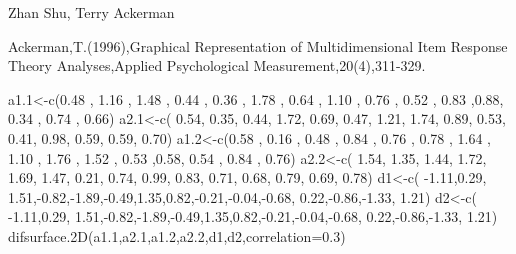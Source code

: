 \begin{Author}\relax
Zhan Shu, Terry Ackerman
\end{Author}
\begin{References}\relax
Ackerman,T.(1996),Graphical Representation of Multidimensional Item Response Theory Analyses,Applied Psychological Measurement,20(4),311-329.
\end{References}
\begin{Examples}
\begin{ExampleCode}
a1.1<-c(0.48 , 1.16 , 1.48 , 0.44 , 0.36 , 1.78 , 0.64 , 1.10 , 0.76 , 0.52 , 0.83 ,0.88, 0.34 , 0.74 , 0.66)
a2.1<-c( 0.54, 0.35, 0.44, 1.72, 0.69, 0.47, 1.21, 1.74, 0.89, 0.53, 0.41, 0.98, 0.59, 0.59, 0.70)
a1.2<-c(0.58 , 0.16 , 0.48 , 0.84 , 0.76 , 0.78 , 1.64 , 1.10 , 1.76 , 1.52 , 0.53 ,0.58, 0.54 , 0.84 , 0.76)
a2.2<-c( 1.54, 1.35, 1.44, 1.72, 1.69, 1.47, 0.21, 0.74, 0.99, 0.83, 0.71, 0.68, 0.79, 0.69, 0.78)
d1<-c( -1.11,0.29, 1.51,-0.82,-1.89,-0.49,1.35,0.82,-0.21,-0.04,-0.68, 0.22,-0.86,-1.33, 1.21)
d2<-c( -1.11,0.29, 1.51,-0.82,-1.89,-0.49,1.35,0.82,-0.21,-0.04,-0.68, 0.22,-0.86,-1.33, 1.21)
difsurface.2D(a1.1,a2.1,a1.2,a2.2,d1,d2,correlation=0.3)
\end{ExampleCode}
\end{Examples}

